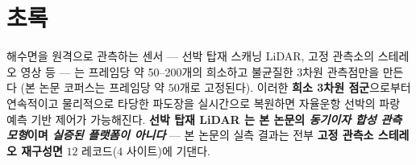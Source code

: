 \documentclass[11pt]{report}
\numberwithin{equation}{chapter}
\numberwithin{figure}{chapter}
\numberwithin{table}{chapter}
\begin{document}
\newpage
\chapter*{초\quad 록}

%
%
%
%
해수면을 원격으로 관측하는 센서 --- 선박 탑재 스캐닝 LiDAR, 고정 관측소의 스테레오
영상 등 --- 는 프레임당 약 50--200개의 희소하고 불균질한 3차원 관측점만을 만든다
(본 논문 코퍼스는 프레임당 약 $50$개로 고정된다). 이러한 \textbf{희소 3차원 점군}으로부터
연속적이고 물리적으로 타당한 파도장을 실시간으로 복원하면 자율운항 선박의 파랑 예측 기반
제어가 가능해진다. \textbf{선박 탑재 LiDAR 는 본 논문의 \emph{동기이자 합성 관측
모형}이며 \emph{실증된 플랫폼이 아니다}} --- 본 논문의 실측 결과는 전부
\textbf{고정 관측소 스테레오 재구성면} $12$ 레코드($4$ 사이트)에 기댄다.
\end{document}
